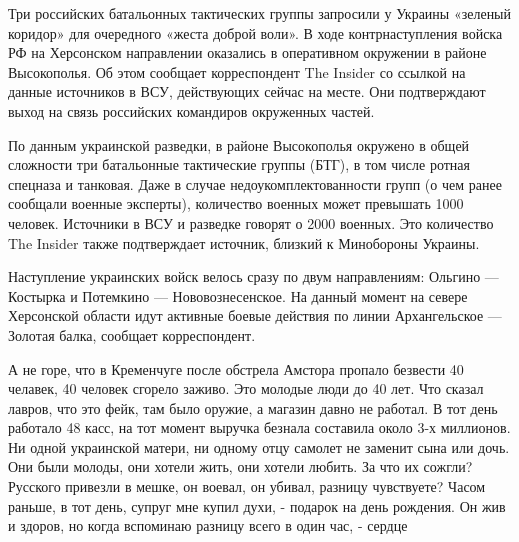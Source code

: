 Три российских батальонных тактических группы запросили у Украины «зеленый
коридор» для очередного «жеста доброй воли». В ходе контрнаступления войска РФ
на Херсонском направлении оказались в оперативном окружении в районе
Высокополья. Об этом сообщает корреспондент The Insider со ссылкой на данные
источников в ВСУ, действующих сейчас на месте. Они подтверждают выход на связь
российских командиров окруженных частей.

По данным украинской разведки, в районе Высокополья окружено в общей сложности
три батальонные тактические группы (БТГ), в том числе ротная спецназа и
танковая. Даже в случае недоукомплектованности групп (о чем ранее сообщали
военные эксперты), количество военных может превышать 1000 человек. Источники в
ВСУ и разведке говорят о 2000 военных. Это количество The Insider также
подтверждает источник, близкий к Минобороны Украины.

Наступление украинских войск велось сразу по двум направлениям: Ольгино —
Костырка и Потемкино — Нововознесенское. На данный момент на севере Херсонской
области идут активные боевые действия по линии Архангельское — Золотая балка,
сообщает корреспондент.

А не горе, что в Кременчуге после обстрела Амстора пропало безвести 40 челавек,
40 человек сгорело заживо. Это молодые люди до 40 лет. Что сказал лавров, что
это фейк, там было оружие, а магазин давно не работал. В тот день работало 48
касс, на тот момент выручка безнала составила около 3-х миллионов. Ни одной
украинской матери, ни одному отцу самолет не заменит сына или дочь. Они были
молоды, они хотели жить, они хотели любить. За что их сожгли? Русского привезли
в мешке, он воевал, он убивал, разницу чувствуете? Часом раньше, в тот день,
супруг мне купил духи, - подарок на день рождения. Он жив и здоров, но когда
вспоминаю разницу всего в один час, - сердце 

